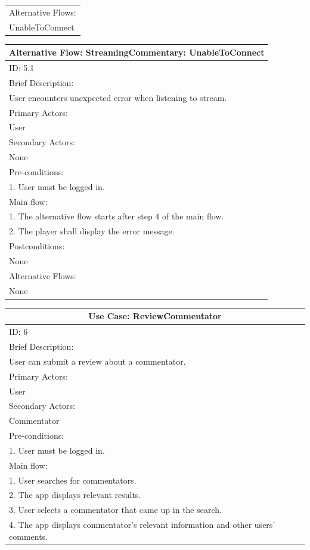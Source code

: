\documentclass{article}
\begin{document}
\begin{flushleft}
\begin{longtable}[l]{|l|}
Alternative Flows:\\
UnableToConnect\\
\hline
\end{longtable}
\begin{longtable}[l]{|l|}
\hline
Alternative Flow: StreamingCommentary: UnableToConnect\\
\hline
ID: 5.1\\
\hline
Brief Description: \\
User encounters unexpected error when listening to stream.\\
\hline
Primary Actors:\\
User\\
\hline
Secondary Actors:\\
None\\
\hline
Pre-conditions:\\
1. User must be logged in.\\
\hline
Main flow:\\
1. The alternative flow starts after step 4 of the main flow.\\
2. The player shall display the error message.\\
\hline
Postconditions:\\
None\\
\hline
Alternative Flows:\\
None\\
\hline
\end{longtable}
\begin{longtable}[l]{|l|}
\hline
\multicolumn{1}{|c|}{Use Case: ReviewCommentator}\\
\hline
ID: 6\\
\hline
Brief Description: \\
User can submit a review about a commentator.\\
\hline
Primary Actors:\\
User\\
\hline
Secondary Actors:\\
Commentator\\
\hline
Pre-conditions:\\
1. User must be logged in.\\
\hline
Main flow:\\
1. User searches for commentators.\\
2. The app displays relevant results.\\
3. User selects a commentator that came up in the search.\\
4. The app displays commentator’s relevant information and other users’ comments.\\

\end{longtable}
\end{flushleft}
\end{document}
